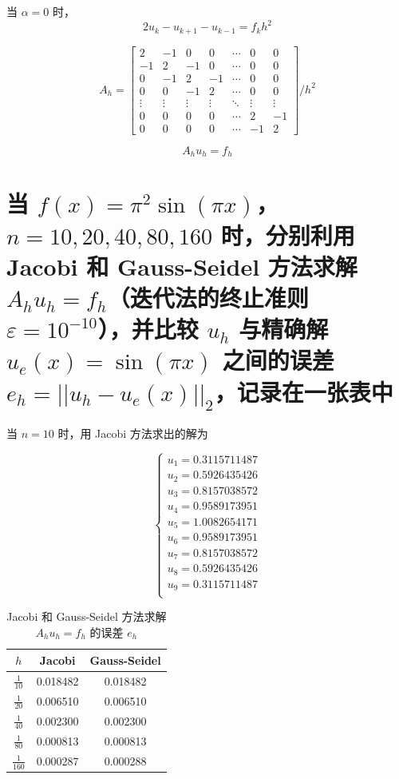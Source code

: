 \documentclass[a4paper,12pt]{ctexart}
\begin{document}
当 $\alpha = 0$ 时，
$$
2u_k - u_{k+1} - u_{k-1} = f_k h^2
$$


$$
A_h = \begin{bmatrix}
    2 & -1 & 0 & 0 & \cdots & 0 & 0 \\
    -1 & 2 & -1 & 0 & \cdots & 0 & 0 \\
    0 & -1 & 2 & -1 & \cdots & 0 & 0 \\
    0 & 0 & -1 & 2 & \cdots & 0 & 0 \\
    \vdots & \vdots & \vdots & \vdots &    \ddots & \vdots & \vdots \\
    0 & 0 & 0 & 0 & \cdots & 2 & -1 \\
    0 & 0 & 0 & 0 & \cdots & -1 & 2
\end{bmatrix} / h^2
$$

$$
A_h u_h = f_h
$$



\section{当 $f(x) = \pi^2 \sin(\pi x)$，$n = 10, 20, 40, 80, 160$ 时，分别利用 Jacobi 和 Gauss-Seidel 方法求解 $A_h u_h = f_h$（迭代法的终止准则 $\varepsilon = 10^{-10}$），并比较 $u_h$ 与精确解 $u_e(x) = \sin(\pi x)$ 之间的误差 $e_h = ||u_h - u_e(x)||_2$，记录在一张表中}



当 $n = 10$ 时，用 Jacobi 方法求出的解为

$$
\begin{cases}
    u_1 = 0.3115711487  \\
    u_2 = 0.5926435426  \\
    u_3 = 0.8157038572  \\
    u_4 = 0.9589173951  \\
    u_5 = 1.0082654171  \\
    u_6 = 0.9589173951  \\
    u_7 = 0.8157038572  \\
    u_8 = 0.5926435426  \\
    u_9 = 0.3115711487  \\
\end{cases}
$$



\begin{table}[ht!]
\centering
\caption{Jacobi 和 Gauss-Seidel 方法求解 $A_h u_h = f_h$ 的误差 $e_h$}
\begin{tabular}{|c|c|c|}
\hline
$h$     &   Jacobi    &   Gauss-Seidel  \\    \hline
$\frac{1}{10}$      &   0.018482        &   0.018482    \\
$\frac{1}{20}$      &   0.006510        &   0.006510    \\
$\frac{1}{40}$      &   0.002300        &   0.002300    \\
$\frac{1}{80}$      &   0.000813        &   0.000813    \\
$\frac{1}{160}$     &   0.000287        &   0.000288    \\
\hline
\end{tabular}
\end{table}
\end{document}
